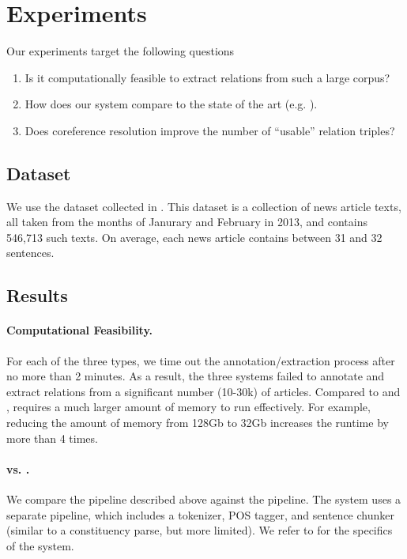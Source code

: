 \section{Experiments}

Our experiments target the following questions
\begin{enumerate}
\item Is it computationally feasible to extract relations from 
  such a large corpus?
\item How does our system compare to the state of the art (e.g. \reverb).
\item Does coreference resolution improve the number of 
  ``usable'' relation triples?
\end{enumerate}

\subsection{Dataset}
We use the \newsspike{} dataset collected in \citet{zhang2013parallelparaphrase}.
This dataset is a collection of news article texts, all taken from the months of
Janurary and February in 2013, and contains 546,713 such texts. On average,
each news article contains between 31 and 32 sentences.

\subsection{Results}



 


\paragraph{Computational Feasibility.}
For each of the three types, we time out
the annotation/extraction process after no more than
2 minutes. As a result, the three systems failed to
annotate and extract relations from 
a significant number (10-30k) of articles. Compared to
\reverb{} and \openie{}, \openiecoref{} requires a much 
larger amount of memory to run effectively. For
example, reducing the amount of memory from 128Gb to
32Gb increases the runtime by more than 4 times.

\paragraph{\openie{} vs. \reverb.}
We compare the \openie{} pipeline described above
against the \reverb{} pipeline. The \reverb{} system uses 
a separate pipeline, which includes a tokenizer, POS tagger,
and sentence chunker (similar to a constituency parse, but 
more limited). 
We refer to \citet{fader11reverb} for
the specifics of the \reverb{} system.

